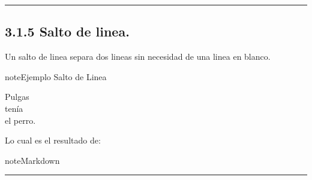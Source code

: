\documentclass[a4paper,10pt,spanish]{sphinxmanual}
\begin{document}
\bigskip\hrule\bigskip



\subsection{3.1.5 Salto de linea.}
\label{\detokenize{3_guia_myst/tipografia:salto-de-linea}}
\sphinxAtStartPar
Un salto de linea separa dos lineas sin necesidad de una linea en blanco.

\begin{sphinxadmonition}{note}{Ejemplo Salto de Linea}

\sphinxAtStartPar
Pulgas \\
tenía \\
el perro.
\end{sphinxadmonition}

\sphinxAtStartPar
Lo cual es el resultado de:

\begin{sphinxadmonition}{note}{Markdown}

\begin{sphinxVerbatim}[commandchars=\\\{\}]
 \PYGZbs{}
 \PYGZbs{}
 
\end{sphinxVerbatim}
\end{sphinxadmonition}


\bigskip\hrule\bigskip
\end{document}
